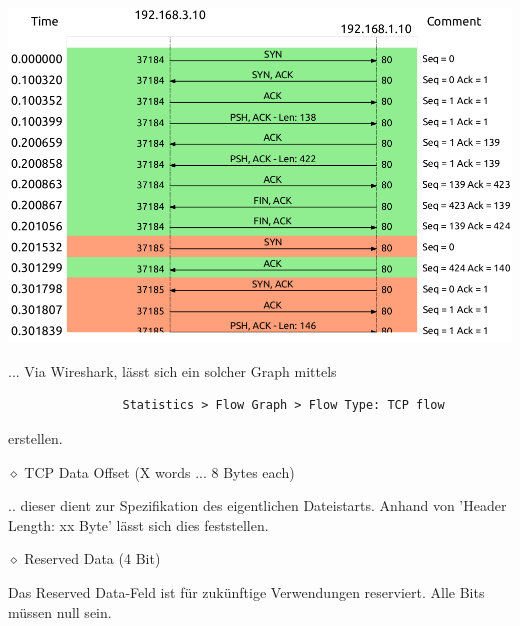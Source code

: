\documentclass[11pt]{article}
\begin{document}
\begin{enumerate}[\thesection .1]
\begin{addmargin}[1em]{1em}
\begin{center}
                \includegraphics[width=\textwidth]{SeqAckFlowgraph.png}
            \end{center}

            ... Via Wireshark, lässt sich ein solcher Graph mittels
            \begin{verbatim}
                Statistics > Flow Graph > Flow Type: TCP flow
            \end{verbatim}
            erstellen.

        \end{addmargin}

        $\diamond$ TCP Data Offset (X words ... 8 Bytes each)
        \begin{addmargin}[1em]{1em}
            .. dieser dient zur Spezifikation des eigentlichen Dateistarts.
            Anhand von 'Header Length: xx Byte' lässt sich dies feststellen.
        \end{addmargin}

        $\diamond$ Reserved Data (4 Bit)
        \begin{addmargin}[1em]{1em}
            Das Reserved Data-Feld ist für zukünftige Verwendungen reserviert. Alle Bits müssen null sein.
        \end{addmargin}


\end{enumerate}
\end{document}
